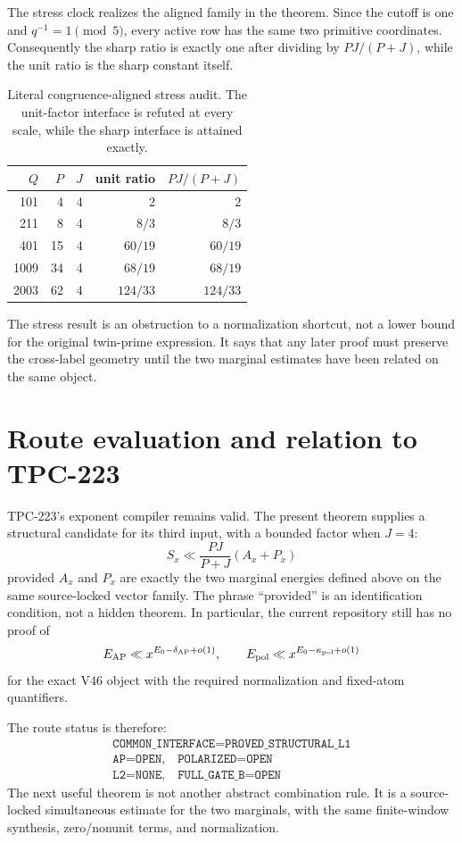 \documentclass[11pt]{article}
\theoremstyle{remark}
\newcommand{\Eap}{E_{\mathrm{AP}}}
\newcommand{\Epol}{E_{\mathrm{pol}}}
\begin{document}
The stress clock realizes the aligned family in the theorem.  Since the cutoff
is one and $q^{-1}=1\pmod5$, every active row has the same two primitive
coordinates.  Consequently the sharp ratio is exactly one after dividing by
$PJ/(P+J)$, while the unit ratio is the sharp constant itself.

\begin{table}[t]
\centering
\small
\begin{tabular}{rrrrr}
\toprule
$Q$ & $P$ & $J$ & unit ratio & $PJ/(P+J)$\\
\midrule
101  & 4  & 4 & $2$ & $2$\\
211  & 8  & 4 & $8/3$ & $8/3$\\
401  & 15 & 4 & $60/19$ & $60/19$\\
1009 & 34 & 4 & $68/19$ & $68/19$\\
2003 & 62 & 4 & $124/33$ & $124/33$\\
\bottomrule
\end{tabular}
\caption{Literal congruence-aligned stress audit.  The unit-factor interface
is refuted at every scale, while the sharp interface is attained exactly.}
\label{tab:stress}
\end{table}

The stress result is an obstruction to a normalization shortcut, not a lower
bound for the original twin-prime expression.  It says that any later proof
must preserve the cross-label geometry until the two marginal estimates have
been related on the same object.

\section{Route evaluation and relation to TPC-223}

TPC-223's exponent compiler remains valid.  The present theorem supplies a
structural candidate for its third input, with a bounded factor when $J=4$:
\[
 S_x\ll \frac{PJ}{P+J}(A_x+P_x)
\]
provided $A_x$ and $P_x$ are exactly the two marginal energies defined above
on the same source-locked vector family.  The phrase ``provided'' is an
identification condition, not a hidden theorem.  In particular, the current
repository still has no proof of
\[
 \Eap\ll x^{E_0-\delta_{\rm AP}+o(1)},
 \qquad
 \Epol\ll x^{E_0-\kappa_{\rm pol}+o(1)}
\]
for the exact V46 object with the required normalization and fixed-atom
quantifiers.

The route status is therefore:
\[
\begin{gathered}
\texttt{COMMON\_INTERFACE=PROVED\_STRUCTURAL\_L1}\\
\texttt{AP=OPEN},\quad \texttt{POLARIZED=OPEN}\\
\texttt{L2=NONE},\quad \texttt{FULL\_GATE\_B=OPEN}
\end{gathered}
\]
The next useful theorem is not another abstract combination rule.  It is a
source-locked simultaneous estimate for the two marginals, with the same
finite-window synthesis, zero/nonunit terms, and normalization.
\end{document}
